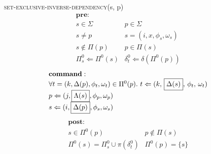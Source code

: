 \documentclass[10pt]{article}
\begin{document}
{\textsc{set-exclusive-inverse-dependency}}(s, p)\\
\[
\begin{array}{ll}
\mathbf{pre}:\\
   s \in \Sigma & p \in \Sigma\\
   s \neq p & s = (i, x, \phi_s, \omega_s)\\
   s \notin \Pi(p)  & p \in \Pi(s)\\
   \Pi^0_s \Leftarrow \Pi^0(s) & \delta^0_t \Leftarrow \delta(\Pi^0(p))
\end{array}
\]
\[
\begin{array}{l}
   \mathbf{command}:\\
   \forall t = (k, \Delta(p), \phi_t, \omega_t) \in \Pi^0(p).\ t \Leftarrow (k,\,\fbox{$\Delta(s)$},\,\phi_t,\, \omega_t)\\
   p \Leftarrow (j, \fbox{$\Lambda(s)$}, \phi_p, \omega_p)\\
   s \Leftarrow (i, \fbox{$\Delta(p)$}, \phi_s, \omega_s)\\
\end{array}
\]
\[
\begin{array}{ll}
   \mathbf{post}:\\
   s \in \Pi^0(p)  & p \notin \Pi(s)\\
   \Pi^0(s) = \Pi^0_s \cup \pi(\delta^0_t)  & \Pi^0(p) = \{ s \}\\
\end{array}
\]
\end{document}

